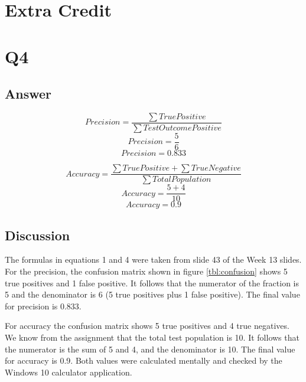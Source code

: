 \documentclass[12pt]{article}
\begin{document}
\section*{Extra Credit}

\section*{Q4}

\subsection*{Answer}
\begin{equation}
    Precision = \frac{\sum True Positive}{\sum Test Outcome Positive}
\end{equation}
\begin{equation}
    Precision = \frac{5}{6}
\end{equation}
\begin{equation}
    Precision = 0.833
\end{equation}

\begin{equation}
    Accuracy = \frac{\sum True Positive + \sum True Negative}{\sum Total Population}
\end{equation}
\begin{equation}
    Accuracy = \frac{5 + 4}{10}
\end{equation}
\begin{equation}
    Accuracy = 0.9
\end{equation}

\subsection*{Discussion}

The formulas in equations 1 and 4 were taken from slide 43 of the Week 13 slides.  For the precision, the confusion matrix shown in figure \ref{tbl:confusion} shows 5 true positives and 1 false positive.  It follows that the numerator of the fraction is 5 and the denominator is 6 (5 true positives plus 1 false positive).  The final value for precision is 0.833.

For accuracy the confusion matrix shows 5 true positives and 4 true negatives.  We know from the assignment that the total test population is 10.  It follows that the numerator is the sum of 5 and 4, and the denominator is 10.  The final value for accuracy is 0.9.  Both values were calculated mentally and checked by the Windows 10 calculator application.
\end{document}
